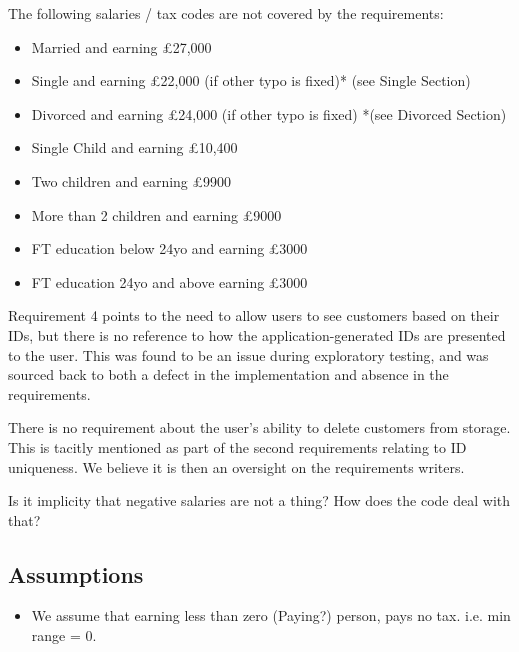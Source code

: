 The following salaries / tax codes are not covered by the requirements: 
\begin{itemize}
	\item Married and earning £27,000
	\item Single and earning £22,000 (if other typo is fixed)* (see Single Section)
	\item Divorced and earning £24,000 (if other typo is fixed) *(see Divorced Section)
	\item Single Child and earning £10,400
	\item Two children and earning £9900
	\item More than 2 children and earning £9000
	\item FT education below 24yo and earning £3000
	\item FT education 24yo and above earning £3000
\end{itemize}


Requirement 4 points to the need to allow users to see customers based on their IDs, but there is no reference to how the application-generated IDs are presented to the user. This was found to be an issue during exploratory testing, and was sourced back to both a defect in the implementation and absence in the requirements. 

There is no requirement about the user's ability to delete customers from storage. This is tacitly mentioned as part of the second requirements relating to ID uniqueness. We believe it is then an oversight on the requirements writers. 


Is it implicity that negative salaries are not a thing? How does the code deal with that? 

\subsection{Assumptions}
\begin{itemize}
	\item We assume that earning less than zero (Paying?) person, pays no tax. i.e. min range = 0. 
\end{itemize}



